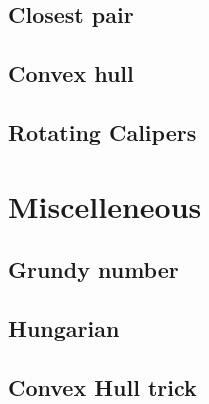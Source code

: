 \documentclass[10pt,landscape,a4paper,twocolumn]{article}
\begin{document}
\subsection{Closest pair}


\subsection{Convex hull}


\subsection{Rotating Calipers}



\section{Miscelleneous}
\subsection{Grundy number}


\subsection{Hungarian}


\subsection{Convex Hull trick}

\end{document}
